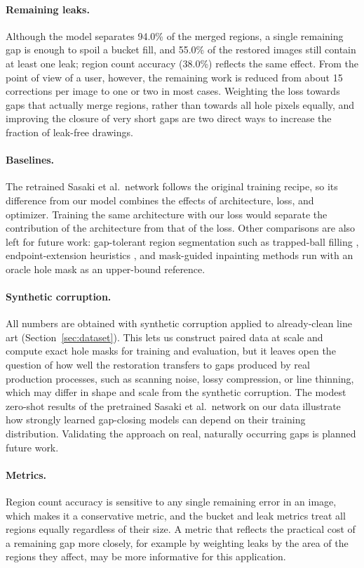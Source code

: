 \documentclass[11pt]{article}
\begin{document}
\paragraph{Remaining leaks.} Although the model separates 94.0\% of the merged
regions, a single remaining gap is enough to spoil a bucket fill, and 55.0\% of the
restored images still contain at least one leak; region count accuracy (38.0\%)
reflects the same effect. From the point of view of a user, however, the remaining
work is reduced from about 15 corrections per image to one or two in most cases.
Weighting the loss towards gaps that actually merge regions, rather than towards all
hole pixels equally, and improving the closure of very short gaps are two direct ways
to increase the fraction of leak-free drawings.

\paragraph{Baselines.} The retrained Sasaki et al.\ network follows the
original training recipe, so its difference from our model combines the effects of
architecture, loss, and optimizer. Training the same architecture with our loss would
separate the contribution of the architecture from that of the loss.
Other comparisons are also left for future work: gap-tolerant region segmentation
such as trapped-ball filling \citep{zhang2009vectorizing}, endpoint-extension heuristics \citep{fourey2018flat}, and mask-guided inpainting methods run with an oracle hole mask as an
upper-bound reference.

\paragraph{Synthetic corruption.} All numbers are obtained with synthetic corruption
applied to already-clean line art (Section~\ref{sec:dataset}). This lets us construct
paired data at scale and compute exact hole masks for training and evaluation, but it
leaves open the question of how well the restoration transfers to gaps produced by
real production processes, such as scanning noise, lossy compression, or line
thinning, which may differ in shape and scale from the synthetic corruption. The
modest zero-shot results of the pretrained Sasaki et al.\ network on our data
illustrate how strongly learned gap-closing models can depend on their training
distribution. Validating the approach on real, naturally occurring gaps is planned
future work.

\paragraph{Metrics.} Region count accuracy is sensitive to any single remaining
error in an image, which makes it a conservative metric, and the bucket and leak
metrics treat all regions equally regardless of their size. A metric that reflects
the practical cost of a remaining gap more closely, for example by weighting leaks by
the area of the regions they affect, may be more informative for this application.
\end{document}
